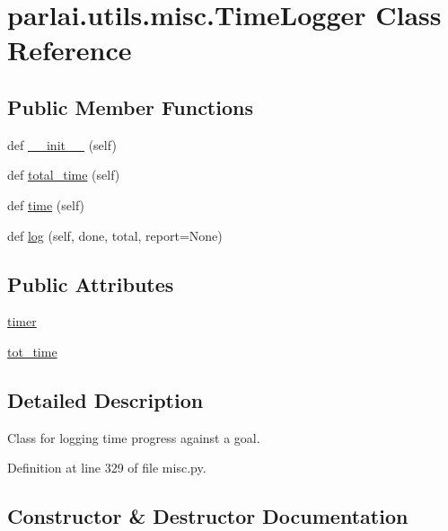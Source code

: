 \hypertarget{classparlai_1_1utils_1_1misc_1_1TimeLogger}{}\section{parlai.\+utils.\+misc.\+Time\+Logger Class Reference}
\label{classparlai_1_1utils_1_1misc_1_1TimeLogger}
\subsection*{Public Member Functions}
\begin{DoxyCompactItemize}
\item 
def \hyperlink{classparlai_1_1utils_1_1misc_1_1TimeLogger_a11aae5a0adf1f9081b5a454b79c89b89}{\+\_\+\+\_\+init\+\_\+\+\_\+} (self)
\item 
def \hyperlink{classparlai_1_1utils_1_1misc_1_1TimeLogger_a18d3faec4442ed5b313c88d566f43b2d}{total\+\_\+time} (self)
\item 
def \hyperlink{classparlai_1_1utils_1_1misc_1_1TimeLogger_aa8e859dc10c12159501bbf545ca62a51}{time} (self)
\item 
def \hyperlink{classparlai_1_1utils_1_1misc_1_1TimeLogger_a52458d882781ad6a6cbcea479ff495de}{log} (self, done, total, report=None)
\end{DoxyCompactItemize}
\subsection*{Public Attributes}
\begin{DoxyCompactItemize}
\item 
\hyperlink{classparlai_1_1utils_1_1misc_1_1TimeLogger_a7592e5ebb754f91e73b66b409fda2d77}{timer}
\item 
\hyperlink{classparlai_1_1utils_1_1misc_1_1TimeLogger_a831849f16f6779f8b77289c3caa65689}{tot\+\_\+time}
\end{DoxyCompactItemize}


\subsection{Detailed Description}
\begin{DoxyVerb}Class for logging time progress against a goal.\end{DoxyVerb}
 

Definition at line 329 of file misc.\+py.



\subsection{Constructor \& Destructor Documentation}
\mbox{\label{classparlai_1_1utils_1_1misc_1_1TimeLogger_a11aae5a0adf1f9081b5a454b79c89b89}} 
